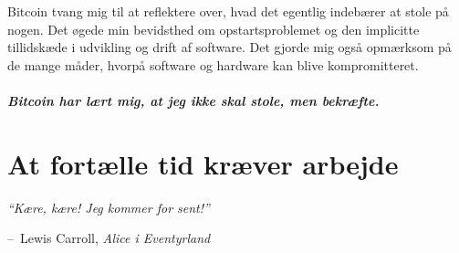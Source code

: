 \documentclass[paper=6in:9in,pagesize=pdftex,
               headinclude=on,footinclude=on,12pt]{scrbook}
\makeatletter
\newenvironment{chapquote}[2][4em]{\setlength{\@tempdima}{#1}%
   \def\chapquote@author{#2}%
   \parshape 1 \@tempdima \dimexpr\textwidth-2\@tempdima\relax%
   \itshape}{\par\normalfont\hfill--\ \chapquote@author\hspace*{\@tempdima}\par\bigskip}
\makeatother
\begin{document}
Bitcoin tvang mig til at reflektere over, hvad det egentlig indebærer at stole på nogen. Det øgede min bevidsthed om opstartsproblemet og den implicitte tillidskæde i udvikling og drift af software. Det gjorde mig også opmærksom på de mange måder, hvorpå software og hardware kan blive kompromitteret.\paragraph{Bitcoin har lært mig, at jeg ikke skal stole, men bekræfte.}%
%
%
%
%

\chapter{At fortælle tid kræver arbejde}
\label{les:17}

\begin{chapquote}{Lewis Carroll, \textit{Alice i Eventyrland}} \enquote{Kære, kære! Jeg kommer for sent!} \end{chapquote}
\end{document}
